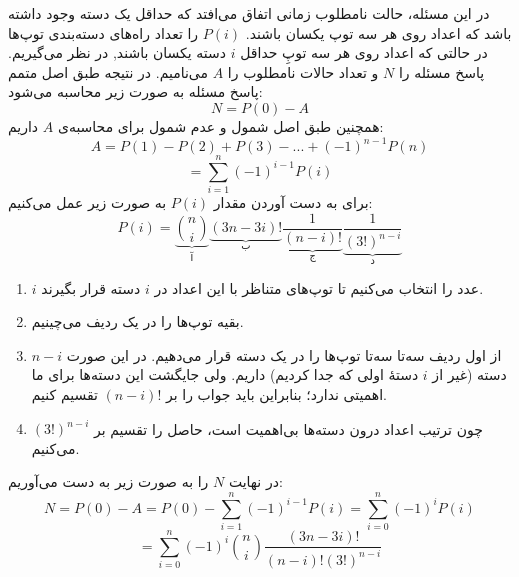     \p
در این مسئله، حالت نامطلوب زمانی اتفاق می‌افتد که حداقل یک دسته‌ وجود داشته باشد که اعداد روی هر سه توپ یکسان باشند.
$P(i)$
را تعداد راه‌های دسته‌بندی توپ‌ها 
در حالتی که
 اعداد روی هر سه توپِ حداقل
   $i$
دسته یکسان باشند, در نظر می‌گیریم. پاسخ مسئله
را $N$
و تعداد حالات نامطلوب را
 $A$ 
 می‌نامیم. در نتیجه طبق اصل متمم پاسخ مسئله به صورت زیر محاسبه‌ می‌شود:
$$N = P(0) - A$$
همچنین طبق اصل شمول و عدم شمول برای محاسبه‌ی 
$A$
داریم:
$$A = P(1) - P(2) + P(3) - ... + (-1)^{n-1}P(n)$$
$$= \sum\limits_{i = 1}^n (-1)^{i-1} P(i)$$
برای به دست آوردن مقدار 
$P(i)$
به صورت زیر عمل می‌کنیم:
$$P(i) = \underbrace{{n  \choose i}}_{\text{آ}}\underbrace{(3n - 3i)!}_{\text{ب}}\underbrace{\frac{1}{(n - i)!}}_{\text{ج}}\underbrace{\frac{1}{(3!)^{n - i}}}_{\text{د}} $$
\begin{enumerate}
	\item 
    	$i$
    	 عدد را انتخاب می‌کنیم تا توپ‌های متناظر با این اعداد در 
    	 $i$
    	  دسته قرار بگیرند.
    	
	\item 
        بقیه توپ‌ها را در یک ردیف می‌چینیم.

    \item
		از اول ردیف سه‌تا سه‌تا توپ‌ها را در یک دسته قرار می‌دهیم. در این صورت $n - i$ دسته (غیر از 
    	$i$ 
    	دستهٔ اولی که جدا کردیم) داریم. ولی جایگشت این دسته‌ها برای ما اهمیتی ندارد؛ بنابراین باید جواب را بر $(n-i)!$ تقسیم کنیم.
    
    	
    \item     
		  چون ترتیب اعداد درون دسته‌ها بی‌اهمیت است، حاصل را تقسیم بر
		  $(3!)^{n-i}$
		   می‌کنیم.

    
	\end{enumerate}
    در نهایت $N$ 
    را به صورت زیر به دست می‌آوریم:
	$$N = P(0) - A = P(0) - \sum\limits_{i = 1}^n (-1)^{i-1} P(i) = \sum\limits_{i = 0}^n (-1)^{i} P(i)$$
	$$= \sum\limits_{i = 0}^n (-1)^i {n \choose i} \frac{(3n - 3i)!}{(n - i)! (3!)^{n - i}}$$

   